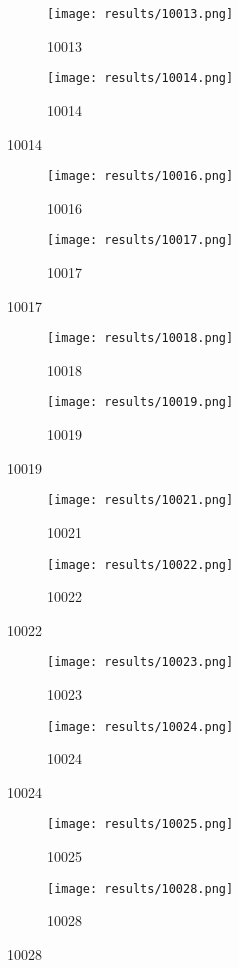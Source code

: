 \documentclass{article}
\begin{document}
\begin{figure}[!hbt]
\begin{subfigure}[!hbt]{0.5\linewidth}\texttt{[image: results/10013.png]}\caption{10013}\end{subfigure}
\begin{subfigure}[!hbt]{0.5\linewidth}\texttt{[image: results/10014.png]}\caption{10014}\end{subfigure}
\end{figure}
\begin{figure}[!hbt]
\begin{subfigure}[!hbt]{0.5\linewidth}\texttt{[image: results/10016.png]}\caption{10016}\end{subfigure}
\begin{subfigure}[!hbt]{0.5\linewidth}\texttt{[image: results/10017.png]}\caption{10017}\end{subfigure}
\end{figure}
\begin{figure}[!hbt]
\begin{subfigure}[!hbt]{0.5\linewidth}\texttt{[image: results/10018.png]}\caption{10018}\end{subfigure}
\begin{subfigure}[!hbt]{0.5\linewidth}\texttt{[image: results/10019.png]}\caption{10019}\end{subfigure}
\end{figure}
\begin{figure}[!hbt]
\begin{subfigure}[!hbt]{0.5\linewidth}\texttt{[image: results/10021.png]}\caption{10021}\end{subfigure}
\begin{subfigure}[!hbt]{0.5\linewidth}\texttt{[image: results/10022.png]}\caption{10022}\end{subfigure}
\end{figure}
\begin{figure}[!hbt]
\begin{subfigure}[!hbt]{0.5\linewidth}\texttt{[image: results/10023.png]}\caption{10023}\end{subfigure}
\begin{subfigure}[!hbt]{0.5\linewidth}\texttt{[image: results/10024.png]}\caption{10024}\end{subfigure}
\end{figure}
\begin{figure}[!hbt]
\begin{subfigure}[!hbt]{0.5\linewidth}\texttt{[image: results/10025.png]}\caption{10025}\end{subfigure}
\begin{subfigure}[!hbt]{0.5\linewidth}\texttt{[image: results/10028.png]}\caption{10028}\end{subfigure}
\end{figure}
\end{document}
